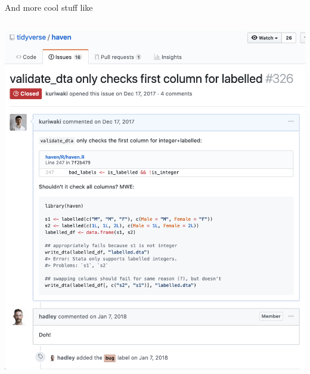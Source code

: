\documentclass[ignorenonframetext,notes, 10pt, aspectratio=169]{beamer}
\begin{document}
\begin{frame}{And more cool stuff like}
\begin{columns}[T]
\begin{column}{0.7\textwidth}
 {\includegraphics[width = 0.7\linewidth]{file-issues.png}}
\end{column}
\end{columns}
\end{frame}
\end{document}

